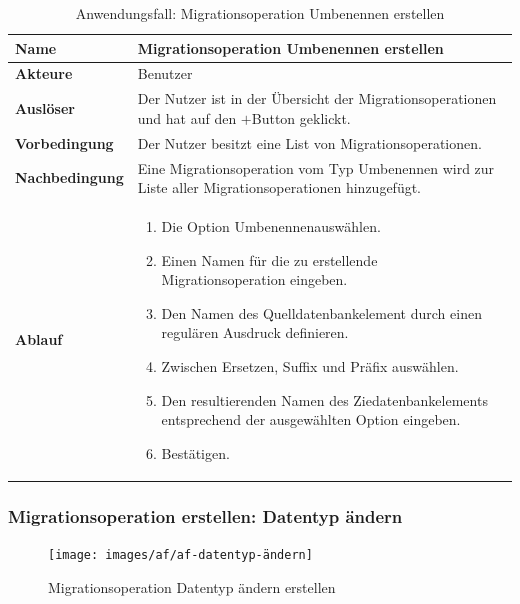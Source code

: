 \begin{table}[H]
	\centering
	\caption{Anwendungsfall: Migrationsoperation Umbenennen erstellen}
	\begin{tabular}{ |p{4cm}|p{8cm}| }
		\hline
		\textbf{Name} &  Migrationsoperation Umbenennen erstellen \\
		\hline
		\textbf{Akteure} & Benutzer \\
		\hline
		\textbf{Auslöser} & Der Nutzer ist in der Übersicht der Migrationsoperationen und hat auf den \glqq $+$\grqq Button geklickt. \\
		\hline
		\textbf{Vorbedingung} & Der Nutzer besitzt eine List von Migrationsoperationen.  \\
		\hline
		\textbf{Nachbedingung} & Eine Migrationsoperation vom Typ Umbenennen wird zur Liste aller Migrationsoperationen hinzugefügt.  \\
		\hline
		\textbf{Ablauf} & 
		\begin{enumerate}
			\item Die Option \glqq Umbenennen\grqq auswählen.
			\item Einen Namen für die zu erstellende Migrationsoperation eingeben.
			\item Den Namen des Quelldatenbankelement durch einen regulären Ausdruck definieren.
			\item Zwischen Ersetzen, Suffix und Präfix auswählen.
			\item Den resultierenden Namen des Ziedatenbankelements entsprechend der ausgewählten Option eingeben.
			\item Bestätigen.
		\end{enumerate}  \\
		\hline
		
	\end{tabular}
	\label{table:umbenennen}
\end{table}




\subsubsection{Migrationsoperation erstellen: Datentyp ändern }
\begin{figure}[H]
	\centering
	\texttt{[image: images/af/af-datentyp-ändern]}
	\caption{Migrationsoperation \glqq Datentyp ändern \grqq erstellen}
	\label{img:af-datentyp-ändern}
\end{figure}

